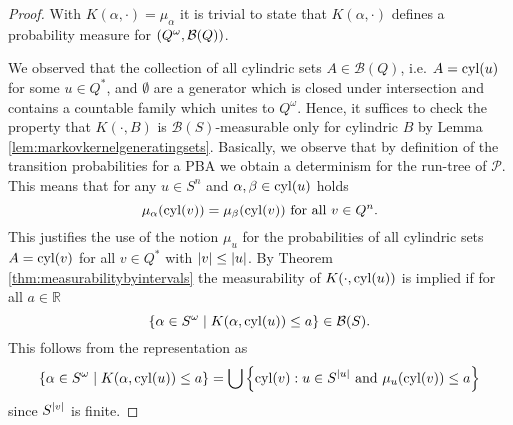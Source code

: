 \begin{proof}
  With $K(\alpha,\cdot) = \mu_{\alpha}$ it is trivial to state that
  $K(\alpha,\cdot)$ defines a probability measure for
  $\left(Q^{\omega},\mathcal{B}(Q)\right)$.

  We observed that the collection of all cylindric sets $A\in\mathcal{B}(Q)$,
  i.e. $A = \operatorname{cyl}(u)$ for some $u\in Q^{*}$, and $\emptyset$ are a generator
  which is closed under intersection and contains a countable family which
  unites to $Q^{\omega}$. Hence, it suffices to check the property that
  $K(\cdot, B)$ is $\mathcal{B}(S)$-measurable only for cylindric $B$ by Lemma
  \ref{lem:markovkernelgeneratingsets}. Basically, we observe that by
  definition of the transition probabilities for a \ac{PBA} we obtain a
  determinism for the run-tree of $\mathcal{P}$. This means that for any
  $u\in S^{n}$ and $\alpha, \beta\in\operatorname{cyl}(u)$ holds
  \begin{equation*}
    \mu_{\alpha}(\operatorname{cyl}(v)) = \mu_{\beta}(\operatorname{cyl}(v))\text{ for all }v\in Q^{n}.
  \end{equation*}
  This justifies the use of the notion $\mu_{u}$ for the probabilities of all
  cylindric sets $A = \operatorname{cyl}(v)$ for all $v\in Q^{*}$ with
  $\left\vert{v}\right\vert\leq\left\vert{u}\right\vert$. By Theorem \ref{thm:measurabilitybyintervals} the
  measurability of $K(\cdot, \operatorname{cyl}(u))$ is implied if for all $a\in\mathbb{R}$
  \begin{equation*}
    \left\{\alpha\in S^{\omega}\mid K(\alpha, \operatorname{cyl}(u))\leq a\right\}\in\mathcal{B}(S).
  \end{equation*}
  This follows from the representation as
  \begin{equation*}
    \left\{\alpha\in S^{\omega}\mid K(\alpha, \operatorname{cyl}(u))\leq a\right\} = 
      \bigcup\left\{
        \operatorname{cyl}(v):u\in S^{\left\vert{u}\right\vert}\text{ and }\mu_{u}(\operatorname{cyl}(v))\leq a
      \right\}
  \end{equation*}
  since $S^{\left\vert{v}\right\vert}$ is finite.
\end{proof}

